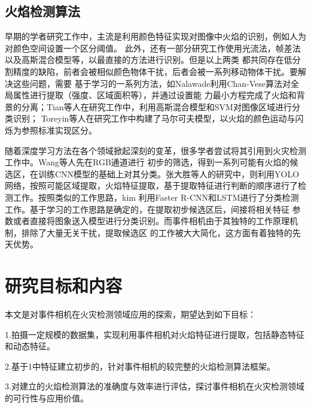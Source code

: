 \subsection{火焰检测算法}

早期的学者研究工作中，主流是利用颜色特征实现对图像中火焰的识别，例如人为对颜色空间设置一个区分阈值\cite{celik2007fire}。
此外，还有一部分研究工作使用光流法，帧差法以及高斯混合模型等，以最直接的方法进行识别。但是以上两类
都共同存在低分割精度的缺陷，前者会被相似颜色物体干扰，后者会被一系列移动物体干扰。要解决这些问题，需要
基于学习的一系列方法，如Nalawade\cite{sruthiautoadaptive}利用Chan-Vese算法对全局属性进行提取（强度、区域面积等），并通过设置能
力最小方程完成了火焰和背景的分离；Tian等人\cite{tian2011smoke}在研究工作中，利用高斯混合模型和SVM对图像区域进行分类识别；
Toreyin等人\cite{toreyin2007online}在研究工作中构建了马尔可夫模型，以火焰的颜色运动与闪烁为参照标准实现区分。

随着深度学习方法在各个领域掀起深刻的变革，很多学者尝试将其引用到火灾检测工作中。Wang等人\cite{wang2016fire}先在RGB通道进行
初步的筛选，得到一系列可能有火焰的候选区，在训练CNN模型的基础上对其分类。张大胜等人\cite{zds}的研究中，则利用YOLO
网络，按照可能区域提取，火焰特征提取，基于提取特征进行判断的顺序进行了检测工作。按照类似的工作思路，kim\cite{kim2019video}
利用Faster R-CNN和LSTM进行了分类检测工作。基于学习的工作思路是确定的，在提取初步候选区后，间接将相关特征
参数或者直接将图象送入模型进行分类识别。而事件相机由于其独特的工作原理机制，排除了大量无关干扰，提取候选区
的工作被大大简化，这方面有着独特的先天优势。

\section{研究目标和内容}

本文是对事件相机在火灾检测领域应用的探索，期望达到如下目标：

1.拍摄一定规模的数据集，实现利用事件相机对火焰特征进行提取，包括静态特征和动态特征。

2.基于1中特征建立初步的，针对事件相机的较完整的火焰检测算法框架。

3.对建立的火焰检测算法的准确度与效率进行评估，探讨事件相机在火灾检测领域的可行性与应用价值。

